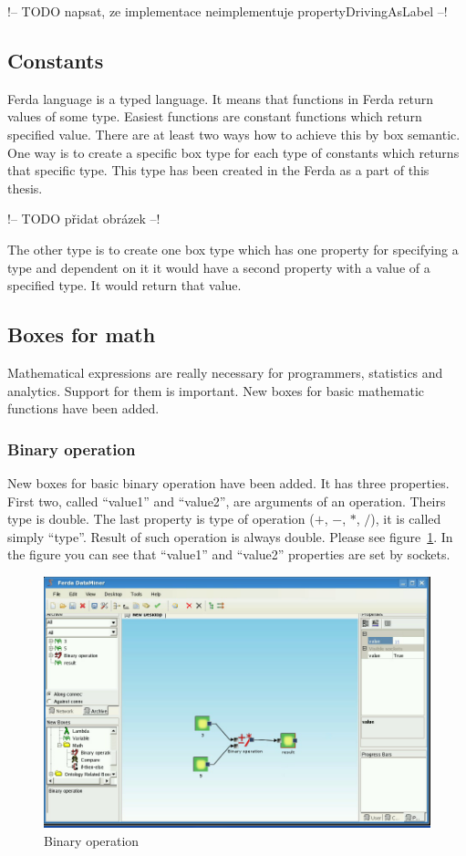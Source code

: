 \documentclass[a4paper,12pt]{book}
\begin{document}
!-- TODO napsat, ze implementace neimplementuje propertyDrivingAsLabel --!

\subsection{Constants}
Ferda language is a typed language. It means that functions in Ferda return values of some type. Easiest functions are constant functions which return specified value. There are at least two ways how to achieve this by box semantic. One way is to create a specific box type for each type of constants which returns that specific type. This type has been created in the Ferda as a part of this thesis.

!-- TODO přidat obrázek --!

The other type is to create one box type which has one property for specifying a type and dependent on it it would have a second property with a value of a specified type. It would return that value.

\subsection{Boxes for math}
Mathematical expressions are really necessary for programmers, statistics and analytics. Support for them is important. New boxes for basic mathematic functions have been added.

\subsubsection{Binary operation}
New boxes for basic binary operation have been added. It has three properties. First two, called ``value1'' and ``value2'', are arguments of an operation. Theirs type is double. The last property is type of operation ($+$, $-$, $*$, $/$), it is called simply ``type''. Result of such operation is always double. Please see figure~\ref{fig:boxBinaryOperation}. In the figure you can see that ``value1'' and ``value2'' properties are set by sockets.
\begin{figure}
	\includegraphics[width=1\textwidth]{binaryOperation2.png}
	\caption{Binary operation}
	\label{fig:boxBinaryOperation}
\end{figure}
\end{document}
